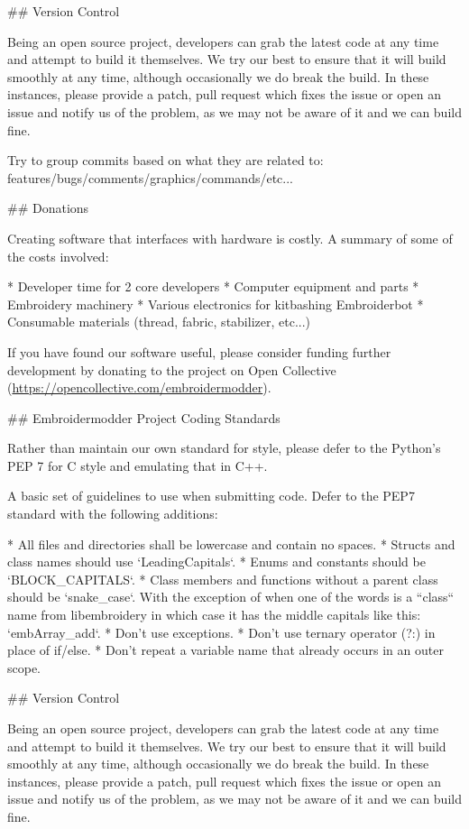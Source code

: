 ## Version Control

Being an open source project, developers can grab the latest code at any time and attempt to build it themselves. We try our best to ensure that it will build smoothly at any time, although occasionally we do break the build. In these instances, please provide a patch, pull request which fixes the issue or open an issue and notify us of the problem, as we may not be aware of it and we can build fine.

Try to group commits based on what they are related to: features/bugs/comments/graphics/commands/etc...

## Donations

Creating software that interfaces with hardware is costly. A summary of some of the costs involved:

* Developer time for 2 core developers
* Computer equipment and parts
* Embroidery machinery
* Various electronics for kitbashing Embroiderbot
* Consumable materials (thread, fabric, stabilizer, etc...)

If you have found our software useful, please consider funding further development by donating to the project on Open Collective
(\url{https://opencollective.com/embroidermodder}).

## Embroidermodder Project Coding Standards

Rather than maintain our own standard for style, please defer to
the Python's PEP 7 %
for C style and emulating that in C++.

A basic set of guidelines to use when submitting code. Defer to the PEP7 standard with the following additions:

* All files and directories shall be lowercase and contain no spaces.
* Structs and class names should use `LeadingCapitals`.
* Enums and constants should be `BLOCK\_CAPITALS`.
* Class members and functions without a parent class should be `snake\_case`. With the exception of when one of the words is a ``class`` name from libembroidery in which case it has the middle capitals like this: `embArray\_add`.
* Don't use exceptions.
* Don't use ternary operator (?:) in place of if/else.
* Don't repeat a variable name that already occurs in an outer scope.

## Version Control

Being an open source project, developers can grab the latest code at any
time and attempt to build it themselves. We try our best to ensure that
it will build smoothly at any time, although occasionally we do break
the build. In these instances, please provide a patch, pull request
which fixes the issue or open an issue and notify us of the problem, as
we may not be aware of it and we can build fine.

